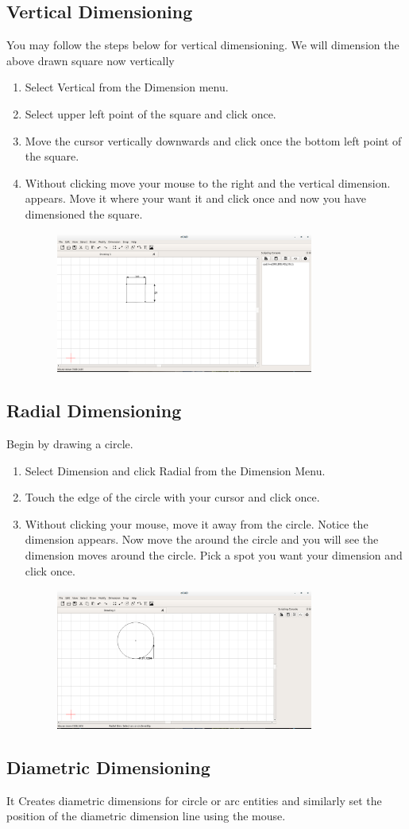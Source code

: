 \subsection{Vertical Dimensioning}
You may follow the steps below for vertical dimensioning. We will dimension the above drawn square now vertically
\begin{enumerate}
\item Select Vertical from the Dimension menu.
\item Select upper left point of the square and click once.
\item Move the cursor vertically downwards and click once the bottom left point of the square.
\item Without clicking move your mouse to the right and the vertical dimension.
appears. Move it where your want it and click once and now you have dimensioned the square.
\begin{figure}[h!]
\centering
\includegraphics[width=0.8\textwidth]{images/vdim.png}
\end{figure}
\end{enumerate}
\subsection{Radial Dimensioning}
Begin by drawing a circle.
\begin{enumerate}
\item Select Dimension and click Radial from the Dimension Menu.
\item Touch the edge of the circle with your cursor and click once.
\item Without clicking your mouse, move it away from the circle. Notice the
dimension appears. Now move the around the circle and you will see the
dimension moves around the circle. Pick a spot you want your dimension and
click once.
\begin{figure}[h!]
\centering
\includegraphics[width=0.8\textwidth]{images/radial.png}
\end{figure}
\end{enumerate}
\subsection{Diametric Dimensioning}
It Creates diametric dimensions for circle or arc entities and similarly set the position of the diametric dimension line using the mouse.
